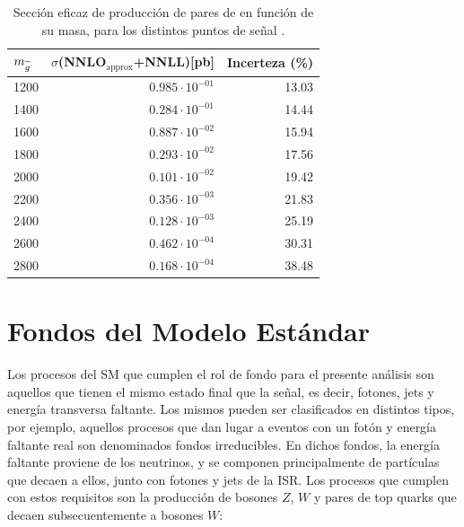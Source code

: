\begin{table}[ht!]
  \centering
  \caption{Sección eficaz de producción de pares de \gluino en función de su masa, para los distintos puntos de señal \cite{susy_xs_web}.}
  \begin{tabular}{l r r}
  \hline
  \hline
    $m_{\widetilde{g}}$    & $\sigma$(NNLO$_\text{approx}$+NNLL)[pb] &    Incerteza (\%)  \\
    \hline
    \hline
    1200 & $0.985 \cdot 10^{-01}$ & 13.03 \\
    1400 & $0.284 \cdot 10^{-01}$ & 14.44 \\
    1600 & $0.887 \cdot 10^{-02}$ & 15.94 \\
    1800 & $0.293 \cdot 10^{-02}$ & 17.56 \\
    2000 & $0.101 \cdot 10^{-02}$ & 19.42 \\
    2200 & $0.356 \cdot 10^{-03}$ & 21.83 \\
    2400 & $0.128 \cdot 10^{-03}$ & 25.19 \\
    2600 & $0.462 \cdot 10^{-04}$ & 30.31 \\
    2800 & $0.168 \cdot 10^{-04}$ & 38.48 \\
    \hline
    \hline
  \end{tabular}
  \label{tab:gino_xs}
\end{table}





\section{Fondos del Modelo Estándar}\label{sec:sm_backgrounds}


Los procesos del SM que cumplen el rol de fondo para el presente análisis son aquellos que tienen el mismo estado final que la señal, es decir, fotones, jets y energía transversa faltante. Los mismos pueden ser clasificados en distintos tipos, por ejemplo, aquellos procesos que dan lugar a eventos con un fotón y energía faltante real son denominados fondos irreducibles. En dichos fondos, la energía faltante proviene de los neutrinos, y se componen principalmente de partículas que decaen a ellos, junto con fotones y jets de la ISR. Los procesos que cumplen con estos requisitos son la producción de bosones $Z$, $W$ y pares de top quarks que decaen subsecuentemente a bosones $W$:

